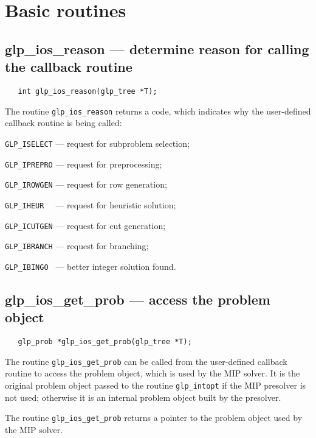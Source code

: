 \section{Basic routines}

\subsection{glp\_ios\_reason --- determine reason for calling the
callback routine}

\synopsis

\begin{verbatim}
   int glp_ios_reason(glp_tree *T);
\end{verbatim}

\returns

The routine \verb|glp_ios_reason| returns a code, which indicates why
the user-defined callback routine is being called:

\verb|GLP_ISELECT| --- request for subproblem selection;

\verb|GLP_IPREPRO| --- request for preprocessing;

\verb|GLP_IROWGEN| --- request for row generation;

\verb|GLP_IHEUR  | --- request for heuristic solution;

\verb|GLP_ICUTGEN| --- request for cut generation;

\verb|GLP_IBRANCH| --- request for branching;

\verb|GLP_IBINGO | --- better integer solution found.

\subsection{glp\_ios\_get\_prob --- access the problem object}

\synopsis

\begin{verbatim}
   glp_prob *glp_ios_get_prob(glp_tree *T);
\end{verbatim}

\description

The routine \verb|glp_ios_get_prob| can be called from the user-defined
callback routine to access the problem object, which is used by the MIP
solver. It is the original problem object passed to the routine
\verb|glp_intopt| if the MIP presolver is not used; otherwise it is an
internal problem object built by the presolver.

\returns

The routine \verb|glp_ios_get_prob| returns a pointer to the problem
object used by the MIP solver.

